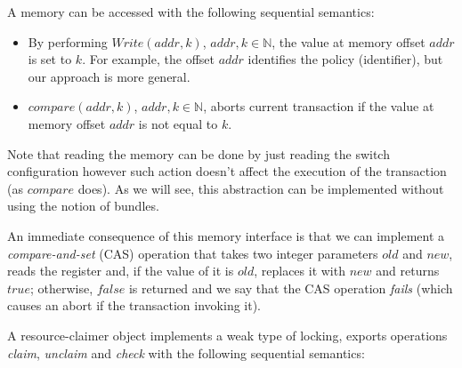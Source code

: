 \documentclass[conference]{sigcomm-alternate}
\newcommand{\Nat}{\mathbb{N}}
\newcommand{\claimcheck}{check\xspace}
\newcommand{\compare}{compare\xspace}
\begin{document}
A memory can be accessed with the following sequential
semantics:

\begin{itemize}
\item By performing $\textit{Write}(addr,k)$,
  $addr,k\in\Nat$, the value at memory offset $addr$ is set to $k$. For
  example, the offset $addr$ identifies the policy (identifier), 
  but our approach is more general.

\item $\textit{\compare}(addr,k)$, $addr,k\in\Nat$,
aborts current transaction if the value at memory offset $addr$ is not equal to $k$.

\end{itemize}

Note that reading the memory can be done by just reading the switch configuration however such action doesn't affect the execution of the transaction (as $\textit{\compare}$ does).
As we will see, this abstraction can be implemented
without using the notion of bundles.

An immediate consequence of this memory interface is 
that we can implement a \emph{compare-and-set} (CAS) operation that takes two integer parameters
$\textit{old}$ and $\textit{new}$, reads the register and, if the
value of it is $\textit{old}$, replaces it with $\textit{new}$ and
returns $\textit{true}$; otherwise, $\textit{false}$ is returned and
we say that the CAS operation \emph{fails} (which causes an abort if
the transaction invoking it).


A resource-claimer object implements a weak type of locking, exports operations \emph{claim},
\emph{unclaim} and \emph{\claimcheck} with the following sequential
semantics:
\end{document}
